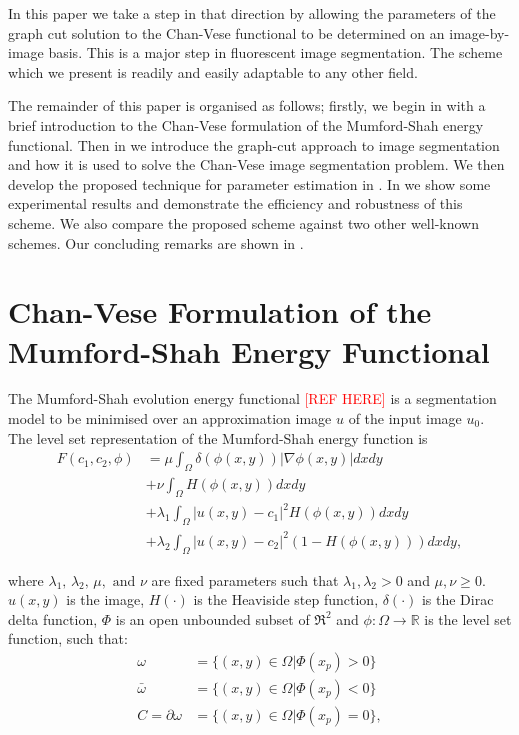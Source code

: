 \documentclass[10pt, journal, letterpaper, onecolumn, draftcls]{IEEEtran}
\begin{document}
In this paper we take a step in that direction by allowing the parameters of the graph cut solution to the Chan-Vese functional to be determined on an image-by-image basis. This is a major step in fluorescent image segmentation. The scheme which we present is readily and easily adaptable to any other field.

The remainder of this paper is organised as follows; firstly, we begin in  with a brief introduction to the Chan-Vese formulation of the  Mumford-Shah energy functional. Then in  we introduce the graph-cut approach to image segmentation and how it is used to solve the Chan-Vese image segmentation problem. We then develop the proposed technique for parameter estimation in . In  we show some experimental results and demonstrate the efficiency and robustness of this scheme. We also compare the proposed scheme against two other well-known schemes. Our concluding remarks are shown in .

\section{Chan-Vese Formulation of the Mumford-Shah Energy Functional}
\label{sec:CVformulation}
The Mumford-Shah evolution energy functional \textcolor{red}{[REF HERE]} is a segmentation model to be minimised over an approximation image $u$ of the input image $u_0$. The level set representation of the Mumford-Shah energy function is 
\begin{equation}
\begin{split}
	F(c_1, c_2, \phi) & = \mu \int_\Omega \delta(\phi(x,y))|\nabla\phi(x,y)|dxdy \\
	& + \nu \int_\Omega H(\phi(x,y))dxdy \\
	& + \lambda_1 \int_\Omega |u(x,y)-c_1|^2H(\phi(x,y))dxdy \\
	& + \lambda_2 \int_\Omega |u(x,y)-c_2|^2(1-H(\phi(x,y)))dxdy,
	\end{split}
	\label{eq:mumfordshahfunction}
\end{equation}

where $\lambda_1, \, \lambda_2, \, \mu, \text{ and } \nu$ are fixed parameters such that $\lambda_1, \lambda_2 > 0$ and $\mu, \nu \geq 0$.  $u(x,y)$ is the image, $H(\cdot)$ is the Heaviside step function, $\delta(\cdot)$ is the Dirac delta function, $\Phi$ is an open unbounded subset of $\Re^2$ and $\phi:\Omega \rightarrow \mathbb{R}$ is the level set function, such that:
\begin{equation}
	\begin{split}
	\omega & = \{(x,y) \in \Omega|\Phi(x_p)>0\} \\
	\bar{\omega} & = \{(x,y) \in \Omega|\Phi(x_p)<0\} \\
	C = \partial\omega & = \{(x,y) \in \Omega|\Phi(x_p)=0\},
	\end{split}
	\label{eq:levelsetrepresentation}
\end{equation}
\end{document}
